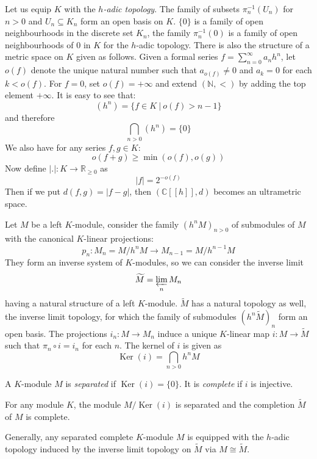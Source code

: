 \documentclass[8pt]{article}
\theoremstyle{definition}
\theoremstyle{definition}
\theoremstyle{definition}
\theoremstyle{definition}
\theoremstyle{definition}
\theoremstyle{definition}
\theoremstyle{definition}
\theoremstyle{definition}
\theoremstyle{definition}
\theoremstyle{definition}
\theoremstyle{definition}
\theoremstyle{definition}
\theoremstyle{definition}
\theoremstyle{definition}
\theoremstyle{question}
\begin{document}
Let us equip $K$ with the \emph{$h$-adic topology}. The family of subsets $\pi^{-1}_n(U_n)$ for $n > 0$ and $U_n \subseteq K_n$ form an open basis on $K$.
$\{ 0 \}$ is a family of open neighbourhoods in the discrete set $K_n$, 
the family $\pi_n^{-1}(0)$ is a family of open neighbourhoods of $0$ in $K$ for the $h$-adic topology.
There is also the structure of a metric space on $K$ given as follows. Given a formal series
$f = \sum \limits_{n = 0}^{\infty} a_n h^n$, let $o(f)$ denote the unique natural number 
such that $a_{o(f)} \neq 0$ and $a_k = 0$ for each $k < o(f)$. For $f = 0$, set $o(f) = +\infty$
and extend $(\mathbb{N}, <)$ by adding the top element $+\infty$. It is easy to see that:
\[
(h^n) = \{ f \in K \: | \: o(f) > n - 1\}
\]
and therefore
\[
\bigcap \limits_{n > 0} (h^n) = \{ 0 \}
\]
We also have for any series $f, g \in K$:
\[
o(f + g) \geq \min (o(f), o(g))
\]
Now define $|.| : K \to \mathbb{R}_{\geq 0}$ as
\[
|f| = 2^{-o(f)}
\]
Then if we put $d(f,g) = |f - g|$, then $(\mathbb{C}[[h]], d)$ becomes an ultrametric space.

Let $M$ be a left $K$-module, consider the family $(h^n M)_{n > 0}$ of submodules of $M$
with the canonical $K$-linear projections:
\[
p_n : M_n = M/h^n M \to M_{n - 1} = M/h^{n - 1} M
\]
They form an inverse system of $K$-modules, so we can consider the inverse limit
\[
\widetilde{M} = \varprojlim \limits_{n} M_n
\]
having a natural structure of a left $K$-module. $\widetilde{M}$ has a natural topology as well,
the inverse limit topology, for which the family of submodules $(h^n \widetilde{M})_n$ form an open basis.
The projections $i_n : M \to M_n$ induce a unique $K$-linear map $i : M \to \widetilde{M}$
such that $\pi_n \circ i = i_n$ for each $n$. The kernel of $i$ is given as
\[
\operatorname{Ker}(i) = \bigcap \limits_{n > 0} h^n M
\]

A $K$-module $M$ is \emph{separated} if $\operatorname{Ker}(i) = \{ 0 \}$. It is \emph{complete} 
if $i$ is injective.

For any module $K$, the module $M/\operatorname{Ker}(i)$ is separated and the completion 
$\widetilde{M}$ of $M$ is complete. 

Generally, any separated complete $K$-module $M$ is equipped with the $h$-adic topology induced
by the inverse limit topology on $\widetilde{M}$ via $M \cong \widetilde{M}$.
\end{document}
